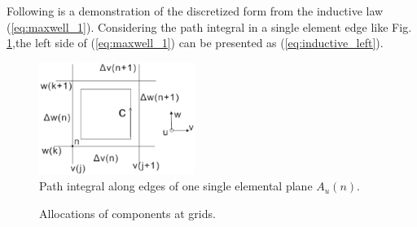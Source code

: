 
Following is a demonstration of the discretized form from the inductive law (\ref{eq:maxwell_1}). Considering the path integral in a single element edge like Fig.  \ref{fig:FIT_max_integral1},the left side of (\ref{eq:maxwell_1}) can be presented as  (\ref{eq:inductive_left}). 

\begin{figure}[!ht]
\centering
\includegraphics[width=0.45\textwidth]{bilder/FIT_max_integral1}
\caption{ Path integral along edges of one single elemental plane $A_{u}(n)$\cite{ script_FeldSim}.}
\label{fig:FIT_max_integral1}
\end{figure}

\begin{figure}[!ht]
\centering
{}
\hfill
{}
\caption{Allocations of components at grids\cite{ script_FeldSim}.}
\end{figure}

